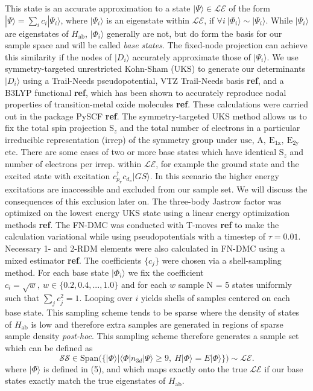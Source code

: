 \documentclass{article}
\begin{document}
This state is an accurate approximation to a state $|\Psi\rangle \in \mathcal{LE}$ of the form $|\Psi \rangle = \sum_i c_i |\Psi_i\rangle$, where $|\Psi_i\rangle$ is an eigenstate within $\mathcal{LE}$, if $\forall i\ |\Phi_i\rangle \sim |\Psi_i\rangle$. While $|\Psi_i\rangle$ are eigenstates of $H_\text{ab}$, $|\Phi_i\rangle$ generally are not, but do form the basis for our sample space and will be called \textit{base states}. The fixed-node projection can achieve this similarity if the nodes of $|D_i\rangle$ accurately approximate those of $|\Psi_i\rangle $. We use symmetry-targeted unrestricted Kohn-Sham (UKS) to generate our determinants $|D_i\rangle$ using a Trail-Needs pseudopotential, VTZ Trail-Needs basis \textbf{ref}, and a B3LYP functional \textbf{ref}, which has been shown to accurately reproduce nodal properties of transition-metal oxide molecules \textbf{ref}. These calculations were carried out in the package PySCF \textbf{ref}. The symmetry-targeted UKS method allows us to fix the total spin projection S$_z$ and the total number of electrons in a particular irreducible representation (irrep) of the symmetry group under use, $\text{A},\ \text{E}_\text{1x},\ \text{E}_\text{2y}$ etc. There are some cases of two or more base states which have identical S$_z$ and number of electrons per irrep. within  $\mathcal{LE}$, for example the ground state and the excited state with excitation $c^\dagger_{p_\pi} c_{d_\pi} |GS\rangle$. In this scenario the higher energy excitations are inaccessible and excluded from our sample set. We will discuss the consequences of this exclusion later on. The three-body Jastrow factor was optimized on the lowest energy UKS state using a linear energy optimization methods \textbf{ref}. The FN-DMC was conducted with T-moves \textbf{ref} to make the calculation variational while using pseudopotentials with a timestep of $\tau = 0.01$. Necessary 1- and 2-RDM elements were also calculated in FN-DMC using a mixed estimator \textbf{ref}. The coefficients $\{c_j\}$ were chosen via a shell-sampling method. For each base state $|\Phi_i\rangle$ we fix the coefficient $c_i = \sqrt{w},\ w \in \{0.2, 0.4, ..., 1.0\}$ and for each $w$ sample N = 5 states uniformly such that $\sum_j c_j^2 = 1$. Looping over $i$ yields shells of samples centered on each base state. This sampling scheme tends to be sparse where the density of states of $H_\text{ab}$ is low and therefore extra samples are generated in regions of sparse sample density \textit{post-hoc}. This sampling scheme therefore generates a sample set which can be defined as 
\begin{equation}
\mathcal{SS} \in \text{Span(}\{ |\Phi \rangle | \langle \Phi | n_{3d} | \Psi \rangle \ge 9,\ H|\Phi\rangle = E |\Phi\rangle \}\text{)} \sim \mathcal{LE}.
\end{equation}
where $|\Phi\rangle$ is defined in (5), and which maps exactly onto the true $\mathcal{LE}$ if our base states exactly match the true eigenstates of $H_\text{ab}$.
\end{document}
